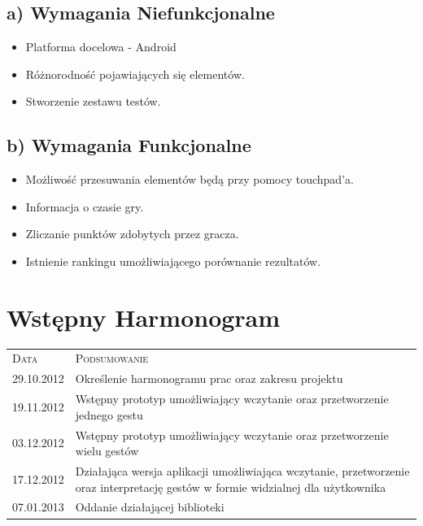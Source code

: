 \documentclass[a4paper,12pt]{article}
\begin{document}
	\subsection*{a) Wymagania Niefunkcjonalne}
	\begin{itemize}
		\item Platforma docelowa - Android
		\item Różnorodność pojawiających się elementów.
		\item Stworzenie zestawu testów.
	\end{itemize}
   		
	\subsection*{b) Wymagania Funkcjonalne}
	\begin{itemize}
		\item Możliwość przesuwania elementów będą przy pomocy touchpad'a.
		\item Informacja o czasie gry.
		\item Zliczanie punktów zdobytych przez gracza.
		\item Istnienie rankingu umożliwiającego porównanie rezultatów.
	\end{itemize}
	
\section{\Large Wstępny Harmonogram}
\begin{tabular}{l p{10cm}}
	\textsc{Data} & \textsc{Podsumowanie} \\[0.1cm]
	 29.10.2012   &  Określenie harmonogramu prac oraz zakresu projektu\\[0.1cm]
	 19.11.2012   &  Wstępny prototyp umożliwiający wczytanie oraz przetworzenie jednego gestu\\[0.1cm]
	 03.12.2012   &  Wstępny prototyp umożliwiający wczytanie oraz przetworzenie wielu gestów\\[0.1cm] 
	 17.12.2012   &  Działająca wersja aplikacji umożliwiająca wczytanie, przetworzenie oraz interpretację gestów w formie widzialnej dla użytkownika\\[0.1cm]
	 07.01.2013   &  Oddanie działającej biblioteki
\end{tabular}
\end{document}
